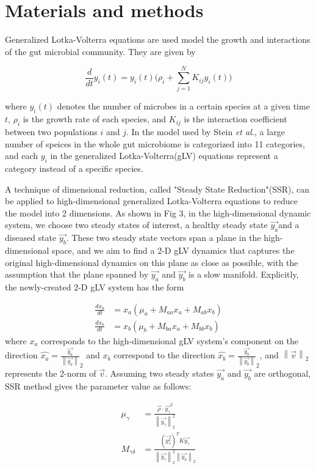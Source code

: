 \documentclass[10pt,letterpaper]{article}
\begin{document}
\section*{Materials and methods}
Generalized Lotka-Volterra equations are used model the growth and interactions of the gut microbial community. They are given by

\begin{equation}
\frac{d}{dt} y_i(t) = y_i(t)\Big( \rho_i  + \sum_{j=1}^N  K_{ij} y_i(t)\Big)
\end{equation}

where $y_{i}(t)$ denotes the number of microbes in a certain species at a given time $t$, $\rho_{i}$ is the growth rate of each species, and $K_{ij}$ is the interaction coefficient between two populations $i$ and $j$. In the model used by Stein \textit{et al.}, a large number of speices in the whole gut microbiome is categorized into 11 categories, and each $y_i$ in the generalized Lotka-Volterra(gLV) equations represent a category instead of a specific species. 

A technique of dimensional reduction, called "Steady State Reduction"(SSR), can be applied to high-dimensional generalized Lotka-Volterra equations to reduce the model into 2 dimensions. As shown in Fig 3, in the high-dimensional dynamic system, we choose two steady states of interest, a healthy steady state $\vec{y_a}$and a diseased state $\vec{y_b}$. These two steady state vectors span a plane in the high-dimensional space, and we aim to find a 2-D gLV dynamics that captures the original high-dimensional dynamics on this plane as close as possible, with the assumption that the plane spanned by $\vec{y_a}$ and $\vec{y_b}$ is a slow manifold. Explicitly, the newly-created 2-D gLV system has the form

\begin{align}
\frac{dx_a}{dt} &= x_a(\mu_a+M_{aa}x_a+M_{ab}x_b) \\
\frac{dx_b}{dt} &= x_b(\mu_b+M_{ba}x_a+M_{bb}x_b)
\end{align}
where $x_a$ corresponds to the high-dimensional gLV system's component on the direction $\hat{x_a} = \frac{\vec{y_a}}{\left\lVert\vec{y_a}\right\rVert}_2$ and $x_b$ correspond to the direction $\hat{x_b} = \frac{\vec{y_b}}{\left\lVert\vec{y_b}\right\rVert}_2$, and $\left\lVert\vec{v}\right\rVert_2$ represents the 2-norm of $\vec{v}$. Assuming two steady states $\vec{y_a}$ and $\vec{y_b}$ are orthogonal, SSR method gives the parameter value as follows:

\begin{align}
\mu_\gamma &= \frac{\vec{\rho}\cdot \vec{y_\gamma}^2}{\left\lVert\vec{y_\gamma}\right\rVert^2_2} \\
M_{\gamma\delta} &= \frac{(\vec{y_\gamma^2})^TK\vec{y_\gamma}}{\left\lVert\vec{y_\gamma}\right\rVert^2_2\left\lVert\vec{y_\delta}\right\rVert_2}
\end{align}
\end{document}
